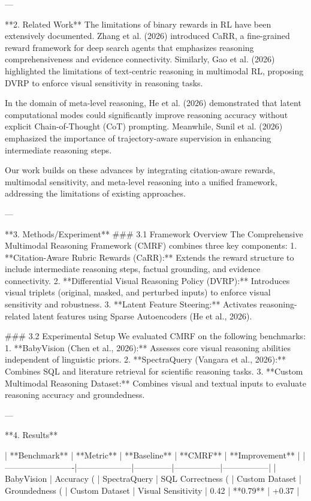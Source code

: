 ---

**2. Related Work**  
The limitations of binary rewards in RL have been extensively documented. Zhang et al. (2026) introduced CaRR, a fine-grained reward framework for deep search agents that emphasizes reasoning comprehensiveness and evidence connectivity. Similarly, Gao et al. (2026) highlighted the limitations of text-centric reasoning in multimodal RL, proposing DVRP to enforce visual sensitivity in reasoning tasks.  

In the domain of meta-level reasoning, He et al. (2026) demonstrated that latent computational modes could significantly improve reasoning accuracy without explicit Chain-of-Thought (CoT) prompting. Meanwhile, Sunil et al. (2026) emphasized the importance of trajectory-aware supervision in enhancing intermediate reasoning steps.  

Our work builds on these advances by integrating citation-aware rewards, multimodal sensitivity, and meta-level reasoning into a unified framework, addressing the limitations of existing approaches.  

---

**3. Methods/Experiment**  
### 3.1 Framework Overview  
The Comprehensive Multimodal Reasoning Framework (CMRF) combines three key components:  
1. **Citation-Aware Rubric Rewards (CaRR):** Extends the reward structure to include intermediate reasoning steps, factual grounding, and evidence connectivity.  
2. **Differential Visual Reasoning Policy (DVRP):** Introduces visual triplets (original, masked, and perturbed inputs) to enforce visual sensitivity and robustness.  
3. **Latent Feature Steering:** Activates reasoning-related latent features using Sparse Autoencoders (He et al., 2026).  

### 3.2 Experimental Setup  
We evaluated CMRF on the following benchmarks:  
1. **BabyVision (Chen et al., 2026):** Assesses core visual reasoning abilities independent of linguistic priors.  
2. **SpectraQuery (Vangara et al., 2026):** Combines SQL and literature retrieval for scientific reasoning tasks.  
3. **Custom Multimodal Reasoning Dataset:** Combines visual and textual inputs to evaluate reasoning accuracy and groundedness.  

---

**4. Results**  

| **Benchmark**          | **Metric**         | **Baseline** | **CMRF**        | **Improvement** |
|-------------------------|--------------------|--------------|-----------------|-----------------|
| BabyVision             | Accuracy (%
| SpectraQuery           | SQL Correctness (%
| Custom Dataset         | Groundedness (%
| Custom Dataset         | Visual Sensitivity | 0.42         | **0.79**        | +0.37           |

